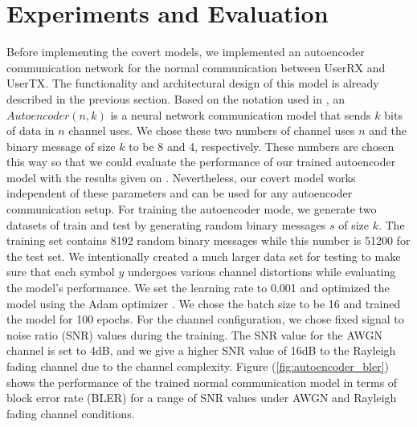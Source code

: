 \section{Experiments and Evaluation}
\label{s:eval}
Before implementing the covert models, we implemented an autoencoder communication network for the normal communication between UserRX and UserTX. The functionality and architectural design of this model is already described in the previous section. Based on the notation used in \cite{o2017introduction}, an \(Autoencoder (n, k)\) is a neural network communication model that sends \(k\) bits of data in \(n\) channel uses. We chose these two numbers of channel uses \(n\) and the binary message of size \(k\) to be 8 and 4, respectively. These numbers are chosen this way so that we could evaluate the performance of our trained autoencoder model with the results given on \cite{o2017introduction}. Nevertheless, our covert model works independent of these parameters and can be used for any autoencoder communication setup. For training the autoencoder mode, we generate two datasets of train and test by generating random binary messages \(s\) of size \(k\). The training set contains 8192 random binary messages while this number is 51200 for the test set. We intentionally created a much larger data set for testing to make sure that each symbol \(y\) undergoes various channel distortions while evaluating the model's performance. We set the learning rate to 0.001 and optimized the model using the Adam optimizer \cite{kingma2014adam}. We chose the batch size to be 16 and trained the model for 100 epochs. For the channel configuration, we chose fixed signal to noise ratio (SNR) values during the training. The SNR value for the AWGN channel is set to 4dB, and we give a higher SNR value of 16dB to the Rayleigh fading channel due to the channel complexity. Figure (\ref{fig:autoencoder_bler}) shows the performance of the trained normal communication model in terms of block error rate (BLER) for a range of SNR values under AWGN and Rayleigh fading channel conditions.\\
